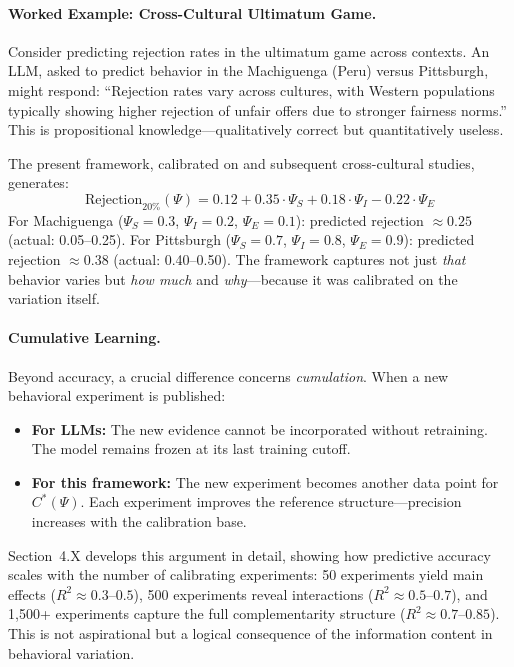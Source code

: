 \paragraph{Worked Example: Cross-Cultural Ultimatum Game.}
Consider predicting rejection rates in the ultimatum game across contexts. An LLM, asked to predict behavior in the Machiguenga (Peru) versus Pittsburgh, might respond: ``Rejection rates vary across cultures, with Western populations typically showing higher rejection of unfair offers due to stronger fairness norms.'' This is propositional knowledge---qualitatively correct but quantitatively useless.

The present framework, calibrated on \citet{henrich2001} and subsequent cross-cultural studies, generates:
\begin{equation}
    \text{Rejection}_{20\%}(\Psi) = 0.12 + 0.35 \cdot \Psi_S + 0.18 \cdot \Psi_I - 0.22 \cdot \Psi_E
\end{equation}
For Machiguenga ($\Psi_S = 0.3$, $\Psi_I = 0.2$, $\Psi_E = 0.1$): predicted rejection $\approx 0.25$ (actual: 0.05--0.25). For Pittsburgh ($\Psi_S = 0.7$, $\Psi_I = 0.8$, $\Psi_E = 0.9$): predicted rejection $\approx 0.38$ (actual: 0.40--0.50). The framework captures not just \emph{that} behavior varies but \emph{how much} and \emph{why}---because it was calibrated on the variation itself.

\paragraph{Cumulative Learning.}
Beyond accuracy, a crucial difference concerns \emph{cumulation}. When a new behavioral experiment is published:
\begin{itemize}
    \item \textbf{For LLMs:} The new evidence cannot be incorporated without retraining. The model remains frozen at its last training cutoff.
    \item \textbf{For this framework:} The new experiment becomes another data point for $C^*(\Psi)$. Each experiment improves the reference structure---precision increases with the calibration base.
\end{itemize}

Section~4.X develops this argument in detail, showing how predictive accuracy scales with the number of calibrating experiments: 50 experiments yield main effects ($R^2 \approx 0.3$--$0.5$), 500 experiments reveal interactions ($R^2 \approx 0.5$--$0.7$), and 1,500+ experiments capture the full complementarity structure ($R^2 \approx 0.7$--$0.85$). This is not aspirational but a logical consequence of the information content in behavioral variation.

